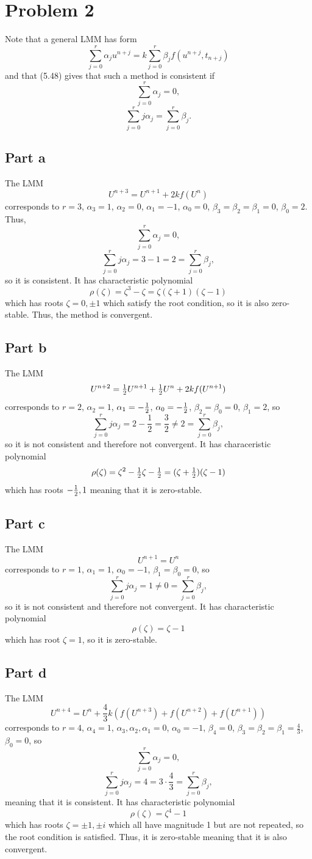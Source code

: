 \documentclass{article}
\begin{document}
\section{Problem 2}
Note that a general LMM has form 
\[
\sum_{j=0}^r\alpha_ju^{n+j}=k\sum_{j=0}^r\beta_jf(u^{n+j},t_{n+j})
\]
and that (5.48) gives that such a method is consistent if
\[
\sum_{j=0}^r\alpha_j=0,
\]
\[
\sum_{j=0}^rj\alpha_j=\sum_{j=0}^r\beta_j.
\]
\subsection{Part a}
The LMM 
\[U^{n+3} = U^{n+1} + 2kf(U^n)\]
corresponds to $r=3$, $\alpha_3=1$, $\alpha_2=0$, $\alpha_1=-1$, $\alpha_0=0$, $\beta_3=\beta_2=\beta_1=0$, $\beta_0=2$. Thus, 
\[
\sum_{j=0}^r\alpha_j=0,
\]
\[
\sum_{j=0}^rj\alpha_j=3-1=2=\sum_{j=0}^r\beta_j,
\]
so it is consistent. It has characteristic polynomial
\[
\rho(\zeta)=\zeta^3-\zeta=\zeta(\zeta+1)(\zeta-1)
\]
which has roots $\zeta=0,\pm1$ which satisfy the root condition, so it is also zero-stable. Thus, the method is convergent. 

\subsection{Part b}
The LMM
\[
U^{n+2} = \mbox{$\frac{1}{2}$} U^{n+1} + \mbox{$\frac{1}{2}$} U^{n} + 2kf(U^{n+1})
\]
corresponds to $r=2$, $\alpha_2=1$, $\alpha_1=-\mbox{$\frac{1}{2}$}$, $\alpha_0=-\mbox{$\frac{1}{2}$}$, $\beta_2=\beta_0=0$, $\beta_1=2$, so
\[
\sum_{j=0}^rj\alpha_j=2-\frac{1}{2}=\frac{3}{2}\neq2=\sum_{j=0}^r\beta_j,
\]
so it is not consistent and therefore not convergent. It has characeristic polynomial
\[
\rho(\zeta)=\zeta^2-\mbox{$\frac{1}{2}$}\zeta-\mbox{$\frac{1}{2}$}=(\zeta+\mbox{$\frac{1}{2}$})(\zeta-1)
\]
which has roots $-\mbox{$\frac{1}{2}$},1$ meaning that it is zero-stable.

\subsection{Part c}
The LMM 
\[
U^{n+1} = U^n
\]
corresponds to $r=1$, $\alpha_1=1$, $\alpha_0=-1$, $\beta_1=\beta_0=0$, so
\[
\sum_{j=0}^rj\alpha_j=1\neq0=\sum_{j=0}^r\beta_j,
\]
so it is not consistent and therefore not convergent. It has characteristic polynomial
\[
\rho(\zeta)=\zeta-1
\]
which has root $\zeta=1$, so it is zero-stable.

\subsection{Part d}
The LMM
\[
U^{n+4} = U^{n} + \frac 4 3 k(f(U^{n+3})+f(U^{n+2})+f(U^{n+1}))
\]
corresponds to $r=4$, $\alpha_4=1$, $\alpha_3,\alpha_2,\alpha_1=0$, $\alpha_0=-1$, $\beta_4=0$, $\beta_3=\beta_2=\beta_1=\frac{4}{3}$, $\beta_0=0$, so 
\[
\sum_{j=0}^r\alpha_j=0,
\]
\[
\sum_{j=0}^rj\alpha_j=4=3\cdot\frac{4}{3}=\sum_{j=0}^r\beta_j,
\]
meaning that it is consistent. It has characteristic polynomial
\[
\rho(\zeta)=\zeta^4-1
\]
which has roots $\zeta=\pm1,\pm i$ which all have magnitude 1 but are not repeated, so the root condition is satisfied. Thus, it is zero-stable meaning that it is also convergent. 
\end{document}
